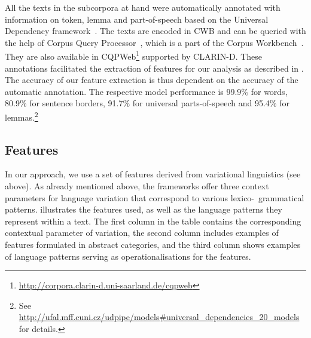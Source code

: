 \documentclass[output=paper,colorlinks,citecolor=brown]{langscibook}
\begin{document}
All the texts in the subcorpora at hand were automatically annotated with information on token, lemma and part-of-speech based on the Universal Dependency framework~\citep{NivreEtAl2017,StrakaStrakova2017}. The texts are encoded in CWB and can be queried with the help of Corpus Query Processor~\citep[CQP,][]{CQP}, which is a part of the Corpus Workbench~\citep[CWB,][]{EvertHardie2011}. %
They are also available in CQPWeb\footnote{\url{http://corpora.clarin-d.uni-saarland.de/cqpweb}} supported by CLARIN-D. These annotations facilitated the extraction of features for our analysis as %
described in . %
The accuracy of our feature extraction is thus dependent on the accuracy of the automatic annotation. The respective model performance is 99.9\% for words, 80.9\% for sentence borders, 91.7\% for universal parts-of-speech and 95.4\% for lemmas.\footnote{See \url{http://ufal.mff.cuni.cz/udpipe/models\#universal\_dependencies\_20\_models} for details.}

\largerpage
\subsection{Features}\label{ssec:features}
In our approach, we use a set of features derived from variational linguistics (see  above). As already mentioned above, the frameworks offer three context parameters for language variation that correspond to various lexico-~grammatical patterns.  illustrates the features used, as well as the language
patterns they represent within a text. The first column in the table contains the corresponding contextual parameter of variation, the second column includes examples of features formulated in abstract categories, and the third column shows examples of language patterns serving as operationalisations for the features.
\end{document}
